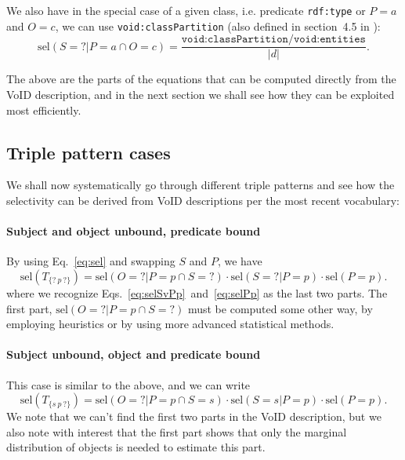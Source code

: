 \documentclass[12pt, draft]{article}
\newcommand{\rdfterm}[1]{\texttt{#1}}
\newcommand{\sel}[1]{\ensuremath{\mathrm{sel}\left(#1\right)}}
\begin{document}
We also have in the special case of a given class, i.e. predicate
\rdfterm{rdf:type} or $P = a$ and $O = c$, we can use
\rdfterm{void:classPartition} (also defined in section~4.5 in
\cite{voidnote}):
\begin{equation}\label{eq:selSvPaOc}
 \sel{S = ? | P = a \cap O = c } =
    \frac{\rdfterm{void:classPartition/void:entities}}{|d|} .
\end{equation}

The above are the parts of the equations that can be computed directly
from the VoID description, and in the next section we shall see how
they can be exploited most efficiently.



 
\subsection{Triple pattern cases}

We shall now systematically go through different triple patterns and
see how the selectivity can be derived from VoID descriptions per the
most recent vocabulary\cite{voidnote}:



\paragraph{Subject and object unbound, predicate bound}

By using Eq.~\ref{eq:sel} and swapping $S$ and $P$, we have 
\begin{equation}\label{eq:selsuobunpb}
\sel{T_{\{?~p~?\}}} = \sel{O = ? | P = p \cap S = ?} \cdot 
\sel{S = ? | P = p} \cdot
\sel{P = p} . 
\end{equation}
where we recognize Eqs.~\ref{eq:selSvPp}~and~\ref{eq:selPp} as the
last two parts. The first part, $\sel{O = ? | P = p \cap S = ?}$ must
be computed some other way, by employing heuristics or by using more
advanced statistical methods. 



\paragraph{Subject unbound, object and predicate bound}

This case is similar to the above, and we can write 
\begin{equation}\label{eq:selsuunobpb}
\sel{T_{\{s~p~?\}}} = \sel{O = ? | P = p \cap S = s} \cdot 
\sel{S = s | P = p} \cdot
\sel{P = p} . 
\end{equation}
We note that we can't find the first two parts in the VoID
description, but we also note with interest that the first part shows
that only the marginal distribution of objects is needed to estimate
this part.
\end{document}

